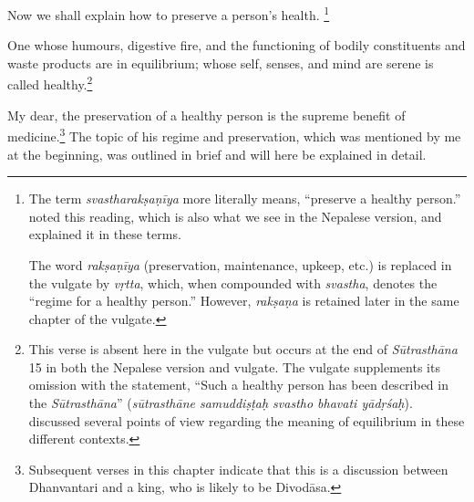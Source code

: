 \begin{translation}    
  
\item [1] 
Now we shall explain how to preserve a person's health.%
	\footnote{The term \emph{svastharakṣaṇīya} more literally means, ``preserve a healthy person.''  noted this reading, which is also what we see in the Nepalese version, and explained it in these terms.
    
    The word \emph{rakṣaṇīya} (preservation, maintenance, upkeep, etc.) is replaced in the vulgate \citep[808]{vulgate} by \emph{vṛtta}, which, when compounded with \emph{svastha}, denotes the “regime for a healthy person.” However, \emph{rakṣaṇa} is retained later in the same chapter of the vulgate.} 

\item [2] One whose humours, digestive fire, and the functioning of
bodily constituents and waste products are in equilibrium; whose self,
senses, and mind are serene is called healthy.\footnote{This verse is
    absent here in the vulgate but occurs at the end of \emph{Sūtrasthāna}
    15 in both the Nepalese version and vulgate. The vulgate
    \citep[808]{vulgate} supplements its omission with the statement,
    ``Such a healthy person has been described in the \emph{Sūtrasthāna}''
    (\emph{sūtrasthāne samuddiṣṭaḥ svastho bhavati yādṛśaḥ}).
     discussed several points of view regarding
    the meaning of equilibrium in these different contexts.}

\item [3] 
My dear, the preservation of a healthy person is the supreme benefit of medicine.\footnote{%
    Subsequent verses in this chapter indicate that this is a discussion between Dhanvantari and a king, who is likely to be Divodāsa.} %
The topic of his regime and preservation, which was mentioned by me at the beginning, was outlined in brief and will here be explained in detail.


\end{translation}
